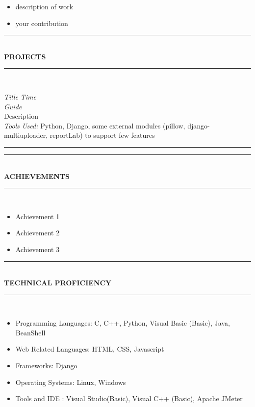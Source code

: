 \documentclass[a4paper,8pt]{article}
\newcommand{\resheading}[1]{

\begin{center}
\rule{\textwidth}{1pt}\vspace{-3pt}\\
	\textsc{{\textbf{#1}}}\vspace{-8pt}\\
\rule{\textwidth}{1pt}\\
\end{center}
\vspace{-5pt}
}
\begin{document}
\begin{itemize}
	\setlength\itemsep{0.05em}
\item  \noindent  description of work
\item \noindent   your contribution

\end{itemize}

\resheading{\textbf{PROJECTS} }
\noindent \textit{Title}                                                                                    \hfill \textit{Time}\\
\textit{Guide}\vspace{3pt}\\
Description\vspace{3pt}\\
\textit{Tools Used: }Python, Django, some external modules (pillow, django-multiuploader, reportLab) to support
few features\\
\rule{\textwidth}{0.5pt}

\resheading{\textbf{ACHIEVEMENTS} }
\vspace{-8pt}
\begin{itemize}
	\setlength\itemsep{0.05em}
	\item Achievement 1
	\item \noindent Achievement 2
	\item \noindent Achievement 3
\end{itemize}

\resheading{\textbf{TECHNICAL PROFICIENCY} }
\vspace{-8pt}
\begin{itemize}
	\setlength\itemsep{0.05em}
\item \noindent Programming Languages: C, C++, Python, Visual Basic (Basic), Java, BeanShell
\item \noindent Web Related Languages: HTML, CSS, Javascript
\item \noindent Frameworks: Django
\item \noindent Operating Systems: Linux, Windows
\item \noindent Tools and IDE : Visual Studio(Basic), Visual C++ (Basic), Apache JMeter
\end{itemize}
\end{document}
